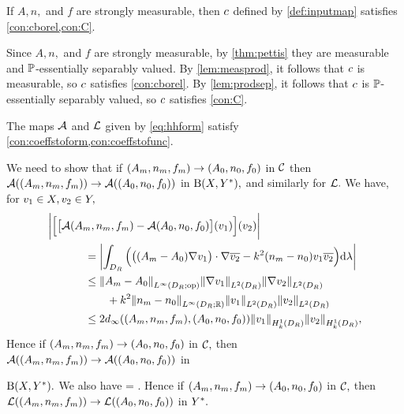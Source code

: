 \label{lem:hh-borelC}
If $A,n,$ and $f$ are strongly measurable, then $c$ defined by  \cref{def:inputmap} satisfies \cref{con:cborel,con:C}.
\ele

\bpf
Since $A,n,$ and $f$ are strongly measurable, by \cref{thm:pettis} they are measurable and $\mathbb P$-essentially separably valued. By \cref{lem:measprod}, it follows that $c$ is measurable, so $c$ satisfies \cref{con:cborel}. By \cref{lem:prodsep}, it follows that $c$ is $\mathbb P$-essentially separably valued, so $c$ satisfies \cref{con:C}.
\epf

\label{lem:hh-AL}
The maps $\mathcal A$ and $\mathcal L$ given by \eqref{eq:hhform} satisfy \cref{con:coeffstoform,con:coeffstofunc}.
\ele

We need to show that if $(A_{m},n_{m},f_{m}) \rightarrow (A_{0},n_{0},f_{0})$ in $\mathcal C$ then $\mathcal A((A_{m},n_{m},f_{m})) \rightarrow \mathcal A((A_{0},n_{0},f_{0}))$ in $\homspace,$ and similarly for $\mathcal L.$ We have, for $v_{1} \in X,v_{2} \in Y,$
\begin{align*}
&\biggabs{\Big[\big[\toform\mleft(\Am,\nm,\fm\mright) - \toform\mleft(\Az,\nz,\fz\mright)\big]\mleft(\vo\mright)\Big]\mleft(\vt\mright)}\\
&\quad\quad\quad\,\,= \abs{\int_{\DR} \Big(\big(\mleft(\Am-\Az\mright)\grad \vo\big)\cdot\grad\vtb- k^2 \mleft(\nm-\nz\mright) \vo\vtb\Big)\dd\Leb}\\
&\quad\quad\quad\,\,\leq\NLiDRRRdtd{\Am-\Az}\NLtDR{\grad \vo}\NLtDR{\grad \vt} 
\\
&\quad\quad\quad\,\,\quad\quad
+k^2\NLiDRRR{\nm-\nz}\NLtDR{\vo}\NLtDR{\vt}\\
&\quad\quad\quad\,\,\leq 2\dinfty((\Am,\nm,\fm),(\Az,\nz,\fz))\NHokDR{\vo}\NHokDR{\vt},
\end{align*}
Hence if $(A_{m},n_{m},f_{m}) \rightarrow (A_{0},n_{0},f_{0})$ in $\mathcal C,$ then $\mathcal A((A_{m},n_{m},f_{m})) \rightarrow \mathcal A((A_{0},n_{0},f_{0}))$ in 

\noindent $\homspace.$ We also have
\beqs
\Bigabs{\big[\rhs\mleft(\mleft(\Am,\nm,\fm\mright),\mright) - \rhs\mleft(\mleft(\Az,\nz,\fz\mright)\mright)\big]\mleft(\vt\mright)} 
 = \abs{\int_{\DR} \mleft(\fm- \fz\mright)\vtb\,\dd\Leb}
 \leq \NLtDR{\fm-\fz} .
\eeqs
Hence if $(A_{m},n_{m},f_{m}) \rightarrow (A_{0},n_{0},f_{0})$ in $\mathcal C,$ then $\mathcal L((A_{m},n_{m},f_{m})) \rightarrow \mathcal L((A_{0},n_{0},f_{0}))$ in $Y^{*}.$
\epf

